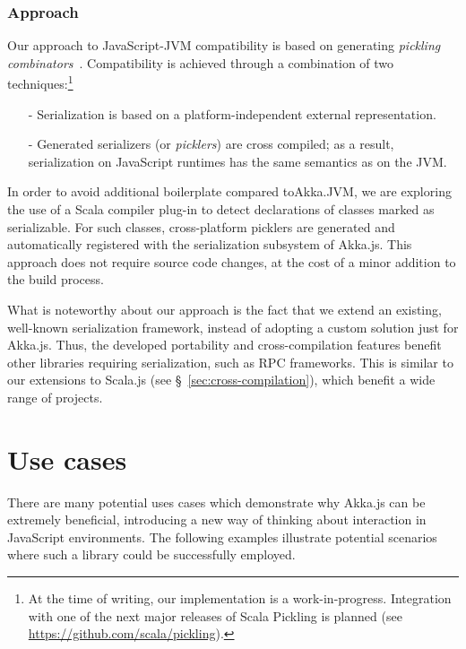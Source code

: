 \documentclass{sig-alternate}
\begin{document}
\subsubsection{Approach}

Our approach to JavaScript-JVM compatibility is based on generating {\em pickling
combinators}~\cite{MillerHBO13}. Compatibility is achieved through a combination of two
techniques:\footnote{At the time of writing, our implementation is a work-in-progress.
Integration with one of the next major releases of Scala Pickling is planned (see
\url{https://github.com/scala/pickling}).}
\begin{itemize}
\item[-] Serialization is based on a platform-independent external representation.
\item[-] Generated serializers (or {\em picklers}) are cross compiled; as a result,
         serialization on JavaScript runtimes has the same semantics as on the JVM.
\end{itemize}

In order to avoid additional boilerplate compared to\newline Akka.JVM, we are exploring
the use of a Scala compiler plug-in to detect declarations of classes
marked as serializable. For such classes, cross-platform picklers are generated
and automatically registered with the serialization subsystem of Akka.js.
This approach does not require source code changes, at the cost of a minor addition
to the build process.

What is noteworthy about our approach is the fact that we extend an existing,
well-known serialization framework, instead of adopting a custom solution just
for Akka.js. Thus, the developed portability and cross-compilation features benefit other
libraries requiring serialization, such as RPC frameworks. This is similar to
our extensions to Scala.js (see \S~\ref{sec:cross-compilation}), which benefit
a wide range of projects.


\section{Use cases}\label{sec:usecases}

There are many potential uses cases which demonstrate why Akka.js can be extremely beneficial, introducing a new way of thinking about interaction in JavaScript environments. The following examples illustrate potential scenarios where such a library could be successfully employed.
\end{document}
